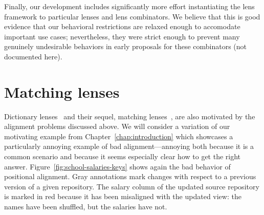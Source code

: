 Finally, our development includes significantly more effort instantiating
the lens framework to particular lenses and lens combinators. We believe
that this is good evidence that our behavioral restrictions are relaxed
enough to accomodate important use cases; nevertheless, they were strict
enough to prevent many genuinely undesirable behaviors in early proposals
for these combinators (not documented here).


\section{Matching lenses}
\label{sec:matching}
Dictionary lenses~\cite{Boomerang07} and their sequel, matching
lenses~\cite{Matching10}, are also motivated by the alignment problems
discussed above. We will consider a variation of our motivating example from
Chapter~\ref{chap:introduction} which showcases a particularly annoying
example of bad alignment---annoying both because it is a common scenario and
because it seems especially clear how to get the right answer.
Figure~\ref{fig:school-salaries-keys} shows again the bad behavior of
positional alignment. Gray annotations mark changes with respect to a
previous version of a given repository. The salary column of the updated
source repository is marked in red because it has been misaligned with the
updated view: the names have been shuffled, but the salaries have not.

